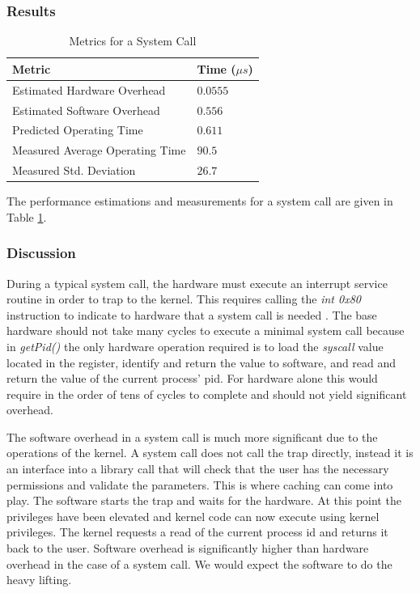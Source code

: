 \documentclass[sigconf]{acmart}
\begin{document}
\subsubsection{Results}
\begin{table}[h!]
\centering
\caption{Metrics for a System Call}
\begin{tabular}{|l|l|}
\hline
\textbf{Metric}             	& \textbf{Time ($\mu s$)} 	\\ \hline
Estimated Hardware Overhead 	& $0.0555$					\\ \hline
Estimated Software Overhead 	& $0.556$					\\ \hline
Predicted Operating Time    	& $0.611$					\\ \hline
Measured Average Operating Time	& $90.5$					\\ \hline
Measured Std. Deviation 		& $26.7$					\\ \hline
\end{tabular}
\label{SysCallMetrics}
\end{table}
The performance estimations and measurements for a system call are given in Table \ref{SysCallMetrics}.

\subsubsection{Discussion}
During a typical system call, the hardware must execute an interrupt service routine in order to trap to the kernel. This requires calling the \textit{int 0x80} instruction to indicate to hardware that a system call is needed \cite{gupta_2014}. The base hardware should not take many cycles to execute a minimal system call because in \textit{getPid()} the only hardware operation required is to load the \textit{syscall} value located in the register, identify and return the value to software, and read and return the value of the current process' pid. For hardware alone this would require in the order of tens of cycles to complete and should not yield significant overhead.

The software overhead in a system call is much more significant due to the operations of the kernel. A system call does not call the trap directly, instead it is an interface into a library call that will check that the user has the necessary permissions and validate the parameters. This is where caching can come into play. The software starts the trap and waits for the hardware. At this point the privileges have been elevated and kernel code can now execute using kernel privileges. The kernel requests a read of the current process id and returns it back to the user. Software overhead is significantly higher than hardware overhead in the case of a system call. We would expect the software to do the heavy lifting.
\end{document}
